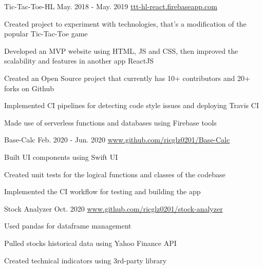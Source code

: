 \begin{cventries}

  \cventry
    {}
    {Tic-Tac-Toe-HL} %
    {May. 2018 - May. 2019} %
    {\url{ttt-hl-react.firebaseapp.com}} %
    {
      \begin{cvitems} %
        \item {Created project to experiment with technologies, that's a modification of the popular Tic-Tac-Toe game}
        \item {Developed an MVP website using HTML, JS and CSS, then improved the scalability and features in another app ReactJS}
        \item {Created an Open Source project that currently has 10+ contributors and 20+ forks on Github}
        \item {Implemented CI pipelines for detecting code style issues and deploying Travis CI}
        \item {Made use of serverless functions and databases using Firebase tools}
      \end{cvitems}
    }

  \cventry
    {}
    {Base-Calc} %
    {Feb. 2020 - Jun. 2020} %
    {\url{www.github.com/ricglz0201/Base-Calc}} %
    {
      \begin{cvitems} %
        \item {Built UI components using Swift UI}
        \item {Created unit tests for the logical functions and classes of the codebase}
        \item {Implemented the CI workflow for testing and building the app}
      \end{cvitems}
    }

  \cventry
    {}
    {Stock Analyzer} %
    {Oct. 2020} %
    {\url{www.github.com/ricglz0201/stock-analyzer}} %
    {
      \begin{cvitems} %
        \item {Used pandas for dataframe management}
        \item {Pulled stocks historical data using Yahoo Finance API}
        \item {Created technical indicators using 3rd-party library}
      \end{cvitems}
    }
\end{cventries}
